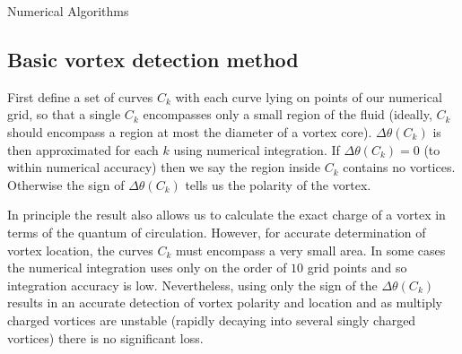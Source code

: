 \begin{chapter}{\label{cha:numerics}Numerical Algorithms}
\subsection{\label{section:vortexloc} Basic vortex detection method}
First define a set of curves $C_k$ with each curve lying on points of our numerical grid, so that a single $C_k$ encompasses only a small region of the fluid (ideally, $C_k$ should encompass a region at most the diameter of a vortex core). $\Delta\theta(C_k)$ is then approximated for each $k$ using numerical integration. If $\Delta\theta(C_k) = 0$ (to within numerical accuracy) then we say the region inside $C_k$ contains no vortices. Otherwise the sign of $\Delta\theta(C_k)$ tells us the polarity of the vortex.

In principle the result also allows us to calculate the exact charge of a vortex in terms of the quantum of circulation. However, for accurate determination of vortex location, the curves $C_k$ must encompass a very small area. In some cases the numerical integration uses only on the order of $10$ grid points and so integration accuracy is low. Nevertheless, using only the sign of the $\Delta\theta(C_k)$ results in an accurate detection of vortex polarity and location and as multiply charged vortices are unstable (rapidly decaying into several singly charged vortices) there is no significant loss.
\begin{figure}
  \centering
\end{figure}
\end{chapter}
